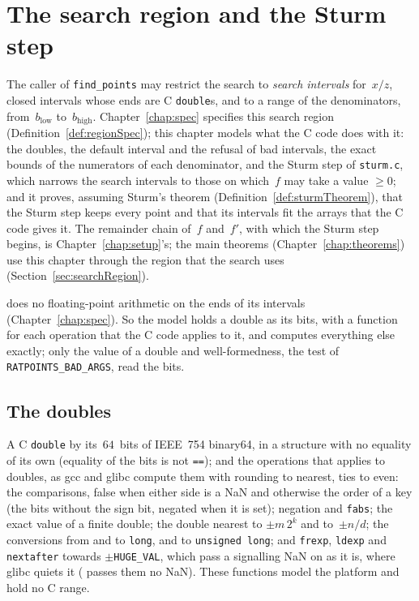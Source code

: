 \chapter{The search region and the Sturm step}\label{chap:region}

The caller of \verb|find_points| may restrict the search to \emph{search intervals} for~$x/z$,
closed intervals whose ends are C \verb|double|s, and to a range of the denominators,
from~$b_{\mathrm{low}}$ to~$b_{\mathrm{high}}$. Chapter~\ref{chap:spec} specifies this search region
(Definition~\ref{def:regionSpec}); this chapter models what the C code does with it: the doubles,
the default interval and the refusal of bad intervals, the exact bounds of the numerators of each
denominator, and the Sturm step of \verb|sturm.c|, which narrows the search intervals to those on
which~$f$ may take a value $\ge 0$; and it proves, assuming Sturm's theorem
(Definition~\ref{def:sturmTheorem}), that the Sturm step keeps every point and that its intervals
fit the arrays that the C code gives it. The remainder chain of~$f$ and~$f'$, with which the Sturm
step begins, is Chapter~\ref{chap:setup}'s; the main theorems (Chapter~\ref{chap:theorems}) use
this chapter through the region that the search uses (Section~\ref{sec:searchRegion}).

\ratpoints{} does no floating-point arithmetic on the ends of its intervals (Chapter~\ref{chap:spec}).
So the model holds a double as its bits, with a function for each operation that the C code applies
to it, and computes everything else exactly; only the value of a double and well-formedness, the
test of \verb|RATPOINTS_BAD_ARGS|, read the bits.

\section{The doubles}\label{sec:doubles}

\begin{definition}\label{def:Double}
  \leanok
  A C \verb|double| by its~$64$~bits of IEEE~754 binary64, in a structure with no equality of its
  own (equality of the bits is not \verb|==|); and the operations that \ratpoints{} applies to
  doubles, as gcc and glibc compute them with rounding to nearest, ties to even: the comparisons,
  false when either side is a NaN and otherwise the order of a key (the bits without the sign bit,
  negated when it is set); negation and \verb|fabs|; the exact value of a finite double; the double
  nearest to $\pm m\,2^k$ and to~$\pm n/d$; the conversions from and to \verb|long|, and to
  \verb|unsigned long|; and \verb|frexp|, \verb|ldexp| and \verb|nextafter| towards
  $\pm$\verb|HUGE_VAL|, which pass a signalling NaN on as it is, where glibc quiets it (\ratpoints{}
  passes them no NaN). These functions model the platform and hold no C range.
\end{definition}


